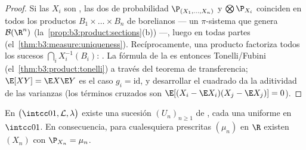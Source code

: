 \begin{proof}
Si las $X_i$ son
, las dos
 de probabilidad
$\P_{(X_1,\dots,X_n)}$ y $\bigotimes\P_{X_i}$ coinciden en todos los
productos $B_1\times\dots\times B_n$ de borelianos --- un $\pi$-sistema
que genera $\mathcal B(\R^n)$ (la~\cref{prop:b3:product:sections}(b))
---, luego en todas partes (el~\cref{thm:b3:measure:uniqueness}).
Recíprocamente, una  producto
factoriza todos los sucesos $\bigcap_iX_i^{-1}(B_i)$:
. La fórmula de
la  es entonces
Tonelli/Fubini (el~\cref{thm:b3:product:tonelli}) a través del teorema
de transferencia; $\E[XY] = \E X\E Y$ es el caso $g_i =
\mathrm{id}$, y desarrollar el cuadrado da la aditividad de las
varianzas (los términos cruzados son $\E[(X_i - \E X_i)(X_j - \E X_j)]
= 0$).
\end{proof}

\begin{theorem}
\label{thm:b3:probability:existence}
En $\bigl(\intcc01, \mathcal L, \lambda\bigr)$ existe una sucesión
$(U_n)_{n\geq1}$ de  ,
cada una uniforme en $\intcc01$. En consecuencia, para cualesquiera
 prescritas $(\mu_n)$ en $\R$
existen $(X_n)$ 
con $\P_{X_n} = \mu_n$.
\end{theorem}

